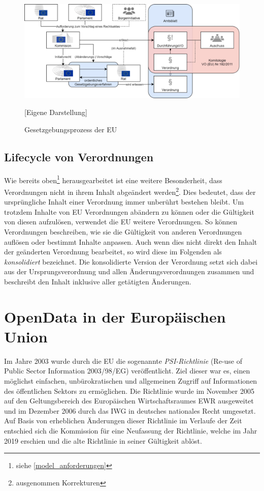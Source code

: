     \begin{figure}[H]
        \centering
        \includegraphics[width=\linewidth]{gfx/Gesegebungsprozess.png}
        \caption{Gesetzgebungsprozess der EU} 
        [Eigene Darstellung]
        \label{fig:europeg}
    \end{figure}
        
\subsection{Lifecycle von Verordnungen}
    
    Wie bereits oben\footnote{siehe \ref{model_anforderungen}} herausgearbeitet ist eine weitere Besonderheit, dass Verordnungen nicht in ihrem Inhalt abgeändert werden\footnote{ausgenommen Korrekturen}.
    Dies bedeutet, dass der ursprüngliche Inhalt einer Verordnung immer unberührt bestehen bleibt.
    Um trotzdem Inhalte von \ac{EU} Verordnungen abändern zu können oder die Gültigkeit von diesen aufzulösen, verwendet die \ac{EU} weitere Verordnungen.
    So können Verordnungen beschreiben, wie sie die Gültigkeit von anderen Verordnungen auflösen oder bestimmt Inhalte anpassen.
    Auch wenn dies nicht direkt den Inhalt der geänderten Verordnung bearbeitet, so wird diese im Folgenden als \textit{konsolidiert} bezeichnet.
    Die konsolidierte Version der Verordnung setzt sich dabei aus der Ursprungsverordnung und allen Änderungsverordnungen zusammen und beschreibt den Inhalt inklusive aller getätigten Änderungen.
    

\section{OpenData in der Europäischen Union}

    Im Jahre 2003 wurde durch die \ac{EU} die sogenannte \textit{PSI-Richtlinie} (Re-use of Public Sector Information 2003/98/\acs{EG}) veröffentlicht.
    Ziel dieser war es, einen möglichst einfachen, unbürokratischen und allgemeinen Zugriff auf Informationen des öffentlichen Sektors zu ermöglichen.
    Die Richtlinie wurde im November 2005 auf den Geltungsbereich des Europäischen Wirtschaftsraumes \acs{EWR} ausgeweitet \cite{2005D0105} und im Dezember 2006 durch das \ac{IWG} in deutsches nationales Recht umgesetzt.
    Auf Basis von erheblichen Änderungen dieser Richtlinie im Verlaufe der Zeit entschied sich die Kommission für eine Neufassung der Richtlinie, welche im Jahr 2019 erschien und die alte Richtlinie in seiner Gültigkeit ablöst. \cite[ErwG. 1ff.]{2003L0098}
        
